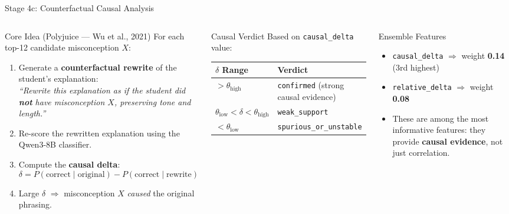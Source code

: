 \documentclass[aspectratio=169]{beamer}
\begin{document}
\begin{frame}{Stage 4c: Counterfactual Causal Analysis}
\begin{columns}[T]
\begin{block}{Core Idea (Polyjuice --- Wu et al., 2021)}
For each top-12 candidate misconception $X$:
\begin{enumerate}
  \item Generate a \textbf{counterfactual rewrite} of the student's explanation:\\
        \textit{``Rewrite this explanation as if the student did \textbf{not} have misconception $X$, preserving tone and length.''}
  \item Re-score the rewritten explanation using the Qwen3-8B classifier.
  \item Compute the \textbf{causal delta}:
        \[ \delta = P(\text{correct} \mid \text{original}) - P(\text{correct} \mid \text{rewrite}) \]
  \item Large $\delta$ $\Rightarrow$ misconception $X$ \textit{caused} the original phrasing.
\end{enumerate}
\end{block}
\begin{block}{Causal Verdict}
Based on \texttt{causal\_delta} value:
\begin{center}
\scriptsize
\begin{tabular}{ll}
\toprule
$\delta$ Range & Verdict\\
\midrule
$> \theta_{\text{high}}$ & \texttt{confirmed} (strong causal evidence)\\
$\theta_{\text{low}} < \delta < \theta_{\text{high}}$ & \texttt{weak\_support}\\
$< \theta_{\text{low}}$ & \texttt{spurious\_or\_unstable}\\
\bottomrule
\end{tabular}
\end{center}
\end{block}
\vspace{8pt}
\begin{block}{Ensemble Features}
\begin{itemize}
  \item \texttt{causal\_delta} $\Rightarrow$ weight \textbf{0.14} (3rd highest)
  \item \texttt{relative\_delta} $\Rightarrow$ weight \textbf{0.08}
  \item These are among the most informative features: they provide \textbf{causal evidence}, not just correlation.
\end{itemize}
\end{block}
\end{columns}
\end{frame}
\end{document}
